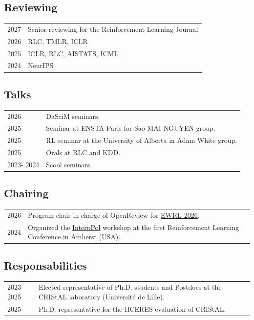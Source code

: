 

\subsection*{Reviewing}
% 
\begin{longtable}[l]{@{}p{} p{}}
    2027 & Senior reviewing for the Reinforcement Learning Journal \\
    2026 & RLC, TMLR, ICLR \\
    2025 & ICLR, RLC, AISTATS, ICML \\
    2024 & NeurIPS
    
\end{longtable}
\subsection*{Talks}
\begin{longtable}[l]{@{}p{} p{}}
    2026 & DaSciM seminars.\\
    2025 & Seminar at ENSTA Paris for Sao MAI NGUYEN group.\\
    2025 & RL seminar at the University of Alberta in Adam White group.\\
    2025 & Orals at RLC and KDD. \\
    2023- 2024 & Scool seminars.
\end{longtable}

\subsection*{Chairing}
% 
\begin{longtable}[l]{@{}p{} p{}}
    2026 & Program chair in charge of OpenReview for \href{https://ewrl-org.github.io/ewrl-2026/index.html}{EWRL 2026}. \\
    2024 & Organized the \href{https://sites.google.com/view/interppol-workshop/home?authuser=0}{InterpPol} workshop at the first Reinforcement Learning Conference in Amherst (USA).
    
\end{longtable}

\subsection*{Responsabilities}
% 
\begin{longtable}[l]{@{}p{} p{}}

    2023-2025 & Elected representative of Ph.D. students and Postdocs at the CRIStAL laboratory (Universit\'e de Lille).\\
    2025 & Ph.D. representative for the HCERES evaluation of CRIStAL.
    
\end{longtable}



